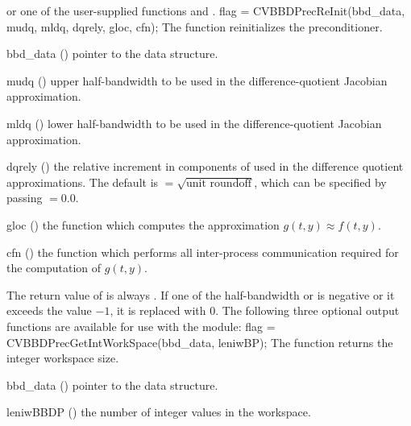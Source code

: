or one of the user-supplied functions  and .
{
  flag = CVBBDPrecReInit(bbd\_data, mudq, mldq, dqrely, gloc, cfn);
}
{
  The function  reinitializes the {\cvbbdpre} preconditioner.
}
{
  \begin{args}
  \item[bbd\_data] ()
    pointer to the {\cvbbdpre} data structure.
  \item[mudq] ()
    upper half-bandwidth to be used in the difference-quotient Jacobian approximation.
  \item[mldq] ()
    lower half-bandwidth to be used in the difference-quotient Jacobian approximation.
  \item[dqrely] ()
    the relative increment in components of  used in the difference quotient
    approximations.  The default is  $= \sqrt{\text{unit roundoff}}$, which
    can be specified by passing  $= 0.0$.
  \item[gloc] ()
    the {\C} function which computes the approximation $g(t,y) \approx f(t,y)$. 
  \item[cfn] ()
    the {\C} function which performs all inter-process communication required for
    the computation of $g(t,y)$.
  \end{args}
}
{
  The return value of  is always .
}
{
  If one of the half-bandwidth  or  is negative or it
  exceeds the value $-1$, it is replaced with 0.
}
The following three optional output functions are available for use with
the {\cvbbdpre} module:
{
  flag = CVBBDPrecGetIntWorkSpace(bbd\_data, leniwBP);
}
{
  The function  returns the
  {\cvbbdpre} integer workspace size.
}
{
  \begin{args}[leniwBBDP]
  \item[bbd\_data] ()
    pointer to the {\cvbbdpre} data structure.
  \item[leniwBBDP] ()
    the number of integer values in the {\cvbbdpre} workspace.
  \end{args}
}
